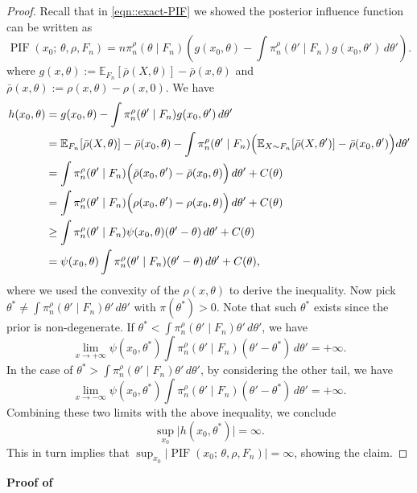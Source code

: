 \documentclass[11pt, oneside]{amsart}
\theoremstyle{definition}   %
\newcommand{\E}{\mathbb{E}}
\newcommand{\PIF}{\operatorname{PIF}}
\newcommand{\loss}{\rho}
\newcommand{\score}{\psi}
\newcommand{\closs}{\bar{\loss}}
\newcommand{\mposterior}{\pi_n^{\loss}}
\begin{document}
\begin{proof}
    Recall that in \eqref{eqn::exact-PIF} we showed the posterior influence function can be written as
    \begin{equation*}
        \PIF(x_0; \,\theta, \rho, F_n) = n \mposterior(\theta \mid F_n) \left ( g(x_0, \theta) - \int \mposterior(\theta' \mid F_n) g(x_0, \theta') \, d\theta' \right ).
    \end{equation*}
    where 
    \(
        g(x,\theta) := \E_{F_n} [ \closs(X, \theta) ] - \closs(x, \theta)
    \)
    and \( \closs ( x, \theta) := \loss(x, \theta) - \loss(x, 0)\). We have
    \[
    \begin{split}
        h(x_0, \theta) 
        &=
        g(x_0, \theta) - \int \mposterior(\theta' \mid F_n) g(x_0, \theta') \, d\theta' \\
        &= 
        \E_{F_n} [ \closs(X, \theta) ] - \closs(x_0, \theta)
        -
        \int \mposterior(\theta' \mid F_n) \Bigl ( \E_{X \sim F_n} [ \closs(X, \theta') ] - \closs(x_0, \theta') \Bigr ) d\theta' \\
        &=
        \int \mposterior(\theta' \mid F_n) \Bigl ( \closs(x_0, \theta') - \closs(x_0, \theta) \Bigr ) \, d\theta' + C(\theta) \\
        &=
        \int \mposterior(\theta' \mid F_n) \Bigl ( \loss(x_0, \theta') - \loss(x_0, \theta) \Bigr ) \, d\theta' + C(\theta) \\
        &\geq
        \int \mposterior(\theta' \mid F_n) \score(x_0, \theta) (\theta' - \theta) \, d\theta' + C(\theta) \\
        &=
        \score(x_0, \theta) \int \mposterior(\theta' \mid F_n) (\theta' - \theta) \, d\theta' + C(\theta),
    \end{split}
    \]
    where we used the convexity of the \( \loss(x, \theta) \) to derive the inequality.
    Now pick \( \theta^* \neq \int \mposterior(\theta' \mid F_n) \theta' \, d\theta' \) with \( \pi(\theta^*) > 0\). Note that such \( \theta^* \) exists since the prior is non-degenerate. If \( \theta^* < \int \mposterior(\theta' \mid F_n) \theta' \, d\theta' \), we have
    \[
        \lim_{x \rightarrow +\infty} \score(x_0, \theta^*) \int \mposterior(\theta' \mid F_n) (\theta' - \theta^*) \, d\theta' = +\infty.
    \]
    In the case of \( \theta^* > \int \mposterior(\theta' \mid F_n) \theta' \, d\theta' \), by considering the other tail, we have
    \[
        \lim_{x \rightarrow - \infty} \score(x_0, \theta^*) \int \mposterior(\theta' \mid F_n) (\theta' - \theta^*) \, d\theta' = +\infty.
    \]
    Combining these two limits with the above inequality, we conclude
    \[
        \sup_{x_0} \bigl | h(x_0, \theta^*) \bigr |
        = 
        \infty.
    \]
    This in turn implies that \(\sup_{x_0} \bigl |\PIF(x_0; \,\theta, \rho, F_n) \bigr | = \infty\), showing the claim.
\end{proof}
%
%
\noindent \textbf{Proof of }
\end{document}
